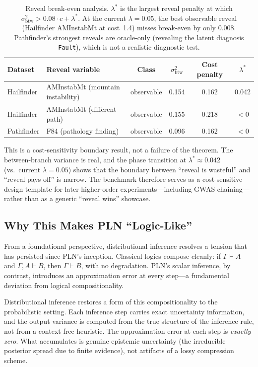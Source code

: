 \documentclass[11pt,openany]{report}
\begin{document}
\begin{table}[ht]
\centering
\small
\begin{tabular}{llcccc}
\toprule
Dataset & Reveal variable & Class & $\sigma^2_{\mathrm{btw}}$
  & Cost penalty & $\lambda^*$ \\
\midrule
Hailfinder & AMInstabMt (mountain instability) & observable & 0.154 & 0.162 & 0.042 \\
Hailfinder & AMInstabMt (different path) & observable & 0.155 & 0.218 & $<0$ \\
Pathfinder & F84 (pathology finding) & observable & 0.096 & 0.162 & $<0$ \\
\bottomrule
\end{tabular}
\caption{Reveal break-even analysis.  $\lambda^*$ is the largest
reveal penalty at which
$\sigma^2_{\mathrm{btw}} > 0.08 \cdot c + \lambda^*$.
At the current $\lambda = 0.05$, the best observable reveal
(Hailfinder AMInstabMt at cost~1.4) misses break-even by only $0.008$.
Pathfinder's strongest reveals are oracle-only (revealing the latent
diagnosis \texttt{Fault}), which is not a realistic diagnostic test.}
\label{tab:reveal-breakeven}
\end{table}

This is a cost-sensitivity boundary result, not a failure of the theorem.
The between-branch variance is real, and the phase transition at
$\lambda^* \approx 0.042$ (vs.\ current $\lambda = 0.05$) shows that the
boundary between ``reveal is wasteful'' and ``reveal pays off'' is narrow.
The benchmark therefore serves as a cost-sensitive design template for
later higher-order experiments---including GWAS chaining---rather than as
a generic ``reveal wins'' showcase.

\subsection*{Why This Makes PLN ``Logic-Like''}

From a foundational perspective, distributional inference resolves a
tension that has persisted since PLN's inception.  Classical logics compose
cleanly: if $\Gamma \vdash A$ and $\Gamma, A \vdash B$, then
$\Gamma \vdash B$, with no degradation.  PLN's scalar inference, by
contrast, introduces an approximation error at every step---a fundamental
deviation from logical compositionality.

Distributional inference restores a form of this compositionality to the
probabilistic setting.  Each inference step carries exact uncertainty
information, and the output variance is computed from the true structure of
the inference rule, not from a context-free heuristic.  The approximation
error at each step is \emph{exactly zero}.  What accumulates is genuine
epistemic uncertainty (the irreducible posterior spread due to finite
evidence), not artifacts of a lossy compression scheme.
\end{document}
